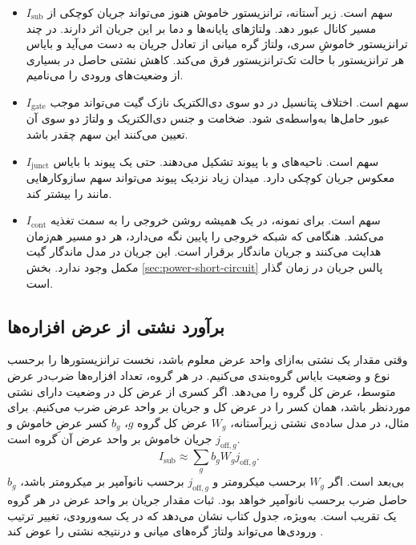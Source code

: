 \begin{itemize}
  \item \(I_{\mathrm{sub}}\) سهم  است.
    زیر آستانه، ترانزیستور خاموش هنوز می‌تواند جریان کوچکی از مسیر
    کانال عبور دهد. ولتاژهای پایانه‌ها و دما بر این جریان اثر دارند.
    در چند ترانزیستور خاموشِ سری، ولتاژ گره میانی از تعادل جریان
    به دست می‌آید و بایاس هر ترانزیستور با حالت تک‌ترانزیستور فرق
    می‌کند. کاهش نشتی حاصل در بسیاری از وضعیت‌های ورودی را
     می‌نامیم.
  \item \(I_{\mathrm{gate}}\) سهم  است. اختلاف
    پتانسیل در دو سوی دی‌الکتریک نازک گیت می‌تواند موجب عبور حامل‌ها
    به‌واسطه‌ی  شود. ضخامت و جنس دی‌الکتریک و ولتاژ
    دو سوی آن تعیین می‌کنند این سهم چقدر باشد.
  \item \(I_{\mathrm{junct}}\) سهم  است.
    ناحیه‌های  و  با  پیوند تشکیل
    می‌دهند. حتی یک پیوند با بایاس معکوس جریان کوچکی دارد. میدان
    زیاد نزدیک پیوند می‌تواند سهم سازوکارهایی مانند
     را بیشتر کند.
  \item \(I_{\mathrm{cont}}\) سهم  است.
    برای نمونه، در  یک  همیشه روشن
    خروجی را به سمت تغذیه می‌کشد. هنگامی که شبکه  خروجی
    را پایین نگه می‌دارد، هر دو مسیر هم‌زمان هدایت می‌کنند و جریان
    ماندگار برقرار است. این جریان در مدل ماندگار گیت مکمل
     وجود ندارد.  بخش
    \ref{sec:power-short-circuit} پالس جریان در زمان گذار است.
\end{itemize}

\subsection{برآورد نشتی از عرض افزاره‌ها}
\label{sec:power-static-estimate}

وقتی مقدار یک نشتی به‌ازای واحد عرض معلوم باشد، نخست ترانزیستورها
را برحسب نوع و وضعیت بایاس گروه‌بندی می‌کنیم. در هر گروه، تعداد
افزاره‌ها ضرب‌در عرض متوسط، عرض کل گروه را می‌دهد. اگر کسری از
عرض کل در وضعیت دارای نشتی موردنظر باشد، همان کسر را در عرض کل
و جریان بر واحد عرض ضرب می‌کنیم. برای مثال، در مدل ساده‌ی نشتی
زیرآستانه، \(W_g\) عرض کل گروه \(g\)، \(b_g\) کسر عرضِ خاموش
و \(j_{\mathrm{off},g}\) جریان خاموش بر واحد عرض آن گروه است.
\cite[بخش ، صفحه ۱۹۷]{weste}
\begin{equation}
  I_{\mathrm{sub}}\approx\sum_g b_g W_g j_{\mathrm{off},g}.
  \label{eq:power-width-leakage}
\end{equation}
\(b_g\) بی‌بعد است. اگر \(W_g\) برحسب میکرومتر و
\(j_{\mathrm{off},g}\) برحسب نانوآمپر بر میکرومتر باشد، حاصل ضرب
برحسب نانوآمپر خواهد بود. ثبات مقدار جریان بر واحد عرض در هر گروه
یک تقریب است. به‌ویژه، جدول  کتاب نشان می‌دهد که در
یک  سه‌ورودی، تغییر ترتیب ورودی‌ها می‌تواند ولتاژ گره‌های
میانی و درنتیجه نشتی را عوض کند \cite[صفحه ۱۹۶]{weste}.

